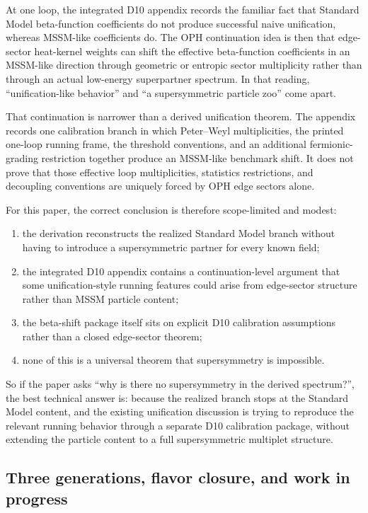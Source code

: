 \documentclass[11pt]{article}
\begin{document}
At one loop, the integrated D10 appendix records the familiar fact that Standard Model beta-function
coefficients do not produce successful naive unification, whereas MSSM-like coefficients do. The
OPH continuation idea is then that edge-sector heat-kernel weights can shift the effective
beta-function coefficients in an MSSM-like direction through geometric or entropic sector
multiplicity rather than through an actual low-energy superpartner spectrum. In that reading,
``unification-like behavior'' and ``a supersymmetric particle zoo'' come apart.

That continuation is narrower than a derived unification theorem. The appendix records one
calibration branch in which Peter--Weyl multiplicities, the printed one-loop running frame, the
threshold conventions, and an additional fermionic-grading restriction together produce an
MSSM-like benchmark shift. It does not prove that those effective loop multiplicities,
statistics restrictions, and decoupling conventions are uniquely forced by OPH edge sectors alone.

For this paper, the correct conclusion is therefore scope-limited and modest:
\begin{enumerate}[leftmargin=2em]
\item the derivation reconstructs the realized Standard Model branch without having to
introduce a supersymmetric partner for every known field;
\item the integrated D10 appendix contains a continuation-level argument that some unification-style running
features could arise from edge-sector structure rather than MSSM particle content;
\item the beta-shift package itself sits on explicit D10 calibration assumptions rather than a closed edge-sector theorem;
\item none of this is a universal theorem that supersymmetry is impossible.
\end{enumerate}

So if the paper asks ``why is there no supersymmetry in the derived spectrum?'', the best
technical answer is: because the realized branch stops at the Standard
Model content, and the existing unification discussion is trying to reproduce the relevant
running behavior through a separate D10 calibration package, without extending the particle content to a full
supersymmetric multiplet structure.

\subsection{Three generations, flavor closure, and work in progress}
\end{document}
